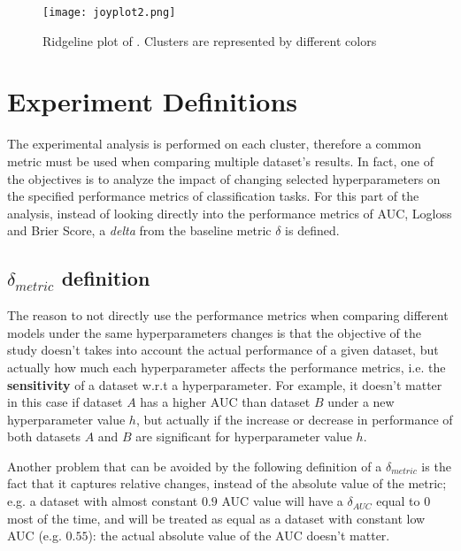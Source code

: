 \begin{figure}[!h]
    \centering
    \texttt{[image: joyplot2.png]}
    \caption{Ridgeline plot of . Clusters are represented by different colors}
    \label{fig:joyplot-2}
\end{figure}


\section{Experiment Definitions}

The experimental analysis is performed on each cluster, therefore a common metric must be used when comparing multiple dataset's results. In fact, one of the objectives is to analyze the impact of changing selected hyperparameters on the specified performance metrics of classification tasks. For this part of the analysis, instead of looking directly into the performance metrics of AUC, Logloss and Brier Score, a \textit{delta} from the baseline metric $\delta$ is defined.

\subsection{\texorpdfstring{$\delta_{metric}$}{delta} definition}

The reason to not directly use the performance metrics when comparing different models under the same hyperparameters changes is that the objective of the study doesn't takes into account the actual performance of a given dataset, but actually how much each hyperparameter affects the performance metrics, i.e. the \textbf{sensitivity} of a dataset w.r.t a hyperparameter. For example, it doesn't matter in this case if dataset $A$ has a higher AUC than dataset $B$ under a new hyperparameter value $h$, but actually if the increase or decrease in performance of both datasets $A$ and $B$ are significant for hyperparameter value $h$. 

Another problem that can be avoided by the following definition of a $\delta_{metric}$ is the fact that it captures relative changes, instead of the absolute value of the metric; e.g. a dataset with almost constant $0.9$ AUC value will have a $\delta_{AUC}$ equal to $0$ most of the time, and will be treated as equal as a dataset with constant low AUC (e.g. $0.55$): the actual absolute value of the AUC doesn't matter.

